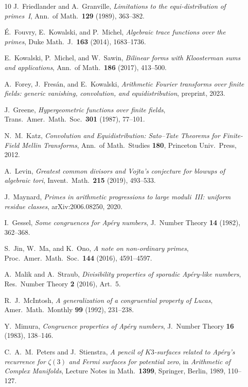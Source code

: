 \documentclass[11pt]{article}
\theoremstyle{definition}
\theoremstyle{remark}
\begin{document}
\begin{thebibliography}{10}
J.~Friedlander and A.~Granville,
\emph{Limitations to the equi-distribution of primes~I},
Ann.\ of Math.\ \textbf{129} (1989), 363--382.

\'E.~Fouvry, E.~Kowalski, and P.~Michel,
\emph{Algebraic trace functions over the primes},
Duke Math.\ J.\ \textbf{163} (2014), 1683--1736.

E.~Kowalski, P.~Michel, and W.~Sawin,
\emph{Bilinear forms with Kloosterman sums and applications},
Ann.\ of Math.\ \textbf{186} (2017), 413--500.

A.~Forey, J.~Fres\'an, and E.~Kowalski,
\emph{Arithmetic Fourier transforms over finite fields:
generic vanishing, convolution, and equidistribution},
preprint, 2023.

J.~Greene,
\emph{Hypergeometric functions over finite fields},
Trans.\ Amer.\ Math.\ Soc.\ \textbf{301} (1987), 77--101.

N.~M.~Katz,
\emph{Convolution and Equidistribution:
Sato--Tate Theorems for Finite-Field Mellin Transforms},
Ann.\ of Math.\ Studies \textbf{180},
Princeton Univ.\ Press, 2012.

A.~Levin,
\emph{Greatest common divisors and Vojta's conjecture
for blowups of algebraic tori},
Invent.\ Math.\ \textbf{215} (2019), 493--533.

J.~Maynard,
\emph{Primes in arithmetic progressions to large moduli~III:
uniform residue classes},
arXiv:2006.08250, 2020.

I.~Gessel,
\emph{Some congruences for Ap\'ery numbers},
J.~Number Theory \textbf{14} (1982), 362--368.

S.~Jin, W.~Ma, and K.~Ono,
\emph{A note on non-ordinary primes},
Proc.\ Amer.\ Math.\ Soc.\ \textbf{144} (2016), 4591--4597.

A.~Malik and A.~Straub,
\emph{Divisibility properties of sporadic Ap\'ery-like numbers},
Res.\ Number Theory \textbf{2} (2016), Art.~5.

R.~J.~McIntosh,
\emph{A generalization of a congruential property of Lucas},
Amer.\ Math.\ Monthly \textbf{99} (1992), 231--238.

Y.~Mimura,
\emph{Congruence properties of Ap\'ery numbers},
J.~Number Theory \textbf{16} (1983), 138--146.

C.~A.~M.~Peters and J.~Stienstra,
\emph{A pencil of $K3$-surfaces related to Ap\'ery's recurrence for
$\zeta(3)$ and Fermi surfaces for potential zero},
in \emph{Arithmetic of Complex Manifolds}, Lecture Notes in Math.\
\textbf{1399}, Springer, Berlin, 1989, 110--127.


\end{thebibliography}
\end{document}
